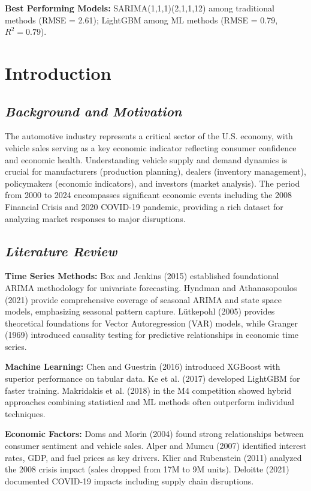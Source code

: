 \documentclass[12pt]{article}
\begin{document}
\textbf{Best Performing Models:} SARIMA(1,1,1)(2,1,1,12) among traditional methods (RMSE = 2.61); LightGBM among ML methods (RMSE = 0.79, $R^2 = 0.79$).

\section*{\textbf{Introduction}}

\subsection*{\textit{Background and Motivation}}

The automotive industry represents a critical sector of the U.S. economy, with vehicle sales serving as a key economic indicator reflecting consumer confidence and economic health. Understanding vehicle supply and demand dynamics is crucial for manufacturers (production planning), dealers (inventory management), policymakers (economic indicators), and investors (market analysis). The period from 2000 to 2024 encompasses significant economic events including the 2008 Financial Crisis and 2020 COVID-19 pandemic, providing a rich dataset for analyzing market responses to major disruptions.

\subsection*{\textit{Literature Review}}

\textbf{Time Series Methods:} Box and Jenkins (2015) established foundational ARIMA methodology for univariate forecasting. Hyndman and Athanasopoulos (2021) provide comprehensive coverage of seasonal ARIMA and state space models, emphasizing seasonal pattern capture. Lütkepohl (2005) provides theoretical foundations for Vector Autoregression (VAR) models, while Granger (1969) introduced causality testing for predictive relationships in economic time series.

\textbf{Machine Learning:} Chen and Guestrin (2016) introduced XGBoost with superior performance on tabular data. Ke et al. (2017) developed LightGBM for faster training. Makridakis et al. (2018) in the M4 competition showed hybrid approaches combining statistical and ML methods often outperform individual techniques.

\textbf{Economic Factors:} Doms and Morin (2004) found strong relationships between consumer sentiment and vehicle sales. Alper and Mumcu (2007) identified interest rates, GDP, and fuel prices as key drivers. Klier and Rubenstein (2011) analyzed the 2008 crisis impact (sales dropped from 17M to 9M units). Deloitte (2021) documented COVID-19 impacts including supply chain disruptions.
\end{document}

